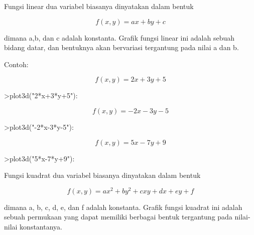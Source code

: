 \documentclass[a4paper,10pt]{article}
\begin{document}
\begin{eulernotebook}
\begin{eulercomment}
\begin{eulercomment}
\begin{eulercomment}
\begin{eulercomment}
\begin{eulercomment}
\begin{eulercomment}
\begin{eulercomment}
\begin{eulercomment}
\begin{eulercomment}
\begin{eulercomment}
\begin{eulercomment}
\begin{eulercomment}
\begin{eulercomment}
\end{eulercomment}
\begin{eulercomment}
Fungsi linear dua variabel biasanya dinyatakan dalam bentuk\\
\end{eulercomment}
\begin{eulerformula}
\[
f(x,y)=ax+by+c
\]
\end{eulerformula}
\begin{eulercomment}
dimana a,b, dan c adalah konstanta.  Grafik fungsi linear ini adalah
sebuah bidang datar, dan bentuknya akan bervariasi tergantung pada
nilai a dan b.

Contoh:\\
\end{eulercomment}
\begin{eulerformula}
\[
f(x,y)=2x+3y+5
\]
\end{eulerformula}
\begin{eulerprompt}
>plot3d("2*x+3*y+5"):
\end{eulerprompt}
\begin{eulerformula}
\[
f(x,y)=-2x-3y-5
\]
\end{eulerformula}
\begin{eulerprompt}
>plot3d("-2*x-3*y-5"):
\end{eulerprompt}
\begin{eulerformula}
\[
f(x,y)=5x-7y+9
\]
\end{eulerformula}
\begin{eulerprompt}
>plot3d("5*x-7*y+9"):
\end{eulerprompt}
\begin{eulercomment}
Fungsi kuadrat dua variabel biasanya dinyatakan dalam bentuk\\
\end{eulercomment}
\begin{eulerformula}
\[
f(x,y)=ax^2+by^2+cxy+dx+ey+f
\]
\end{eulerformula}
\begin{eulercomment}
dimana a, b, c, d, e, dan f adalah konstanta. Grafik fungsi kuadrat
ini adalah sebuah permukaan yang dapat memiliki berbagai bentuk
tergantung pada nilai-nilai konstantanya.


\end{eulercomment}
\end{eulercomment}
\end{eulercomment}
\end{eulercomment}
\end{eulercomment}
\end{eulercomment}
\end{eulercomment}
\end{eulercomment}
\end{eulercomment}
\end{eulercomment}
\end{eulercomment}
\end{eulercomment}
\end{eulercomment}
\end{eulernotebook}
\end{document}
